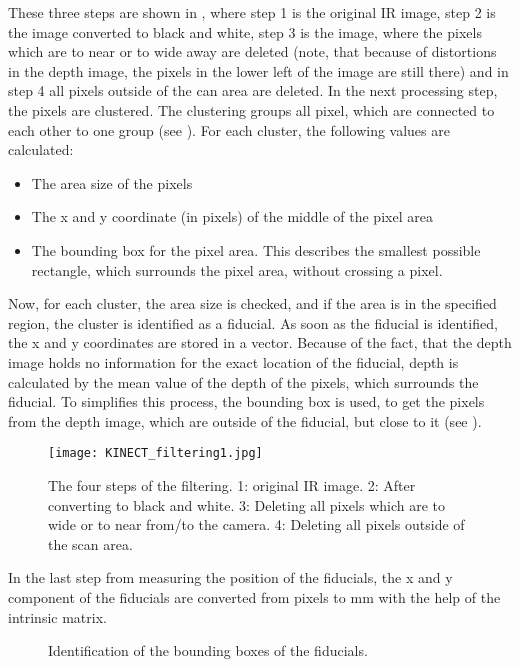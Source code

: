 These three steps are shown in , where step 1 is the original IR image, step 2 is the image converted to black and white, step 3 is the image, where the pixels which are to near or to wide away are deleted (note, that because of distortions in the depth image, the pixels in the lower left of the image are still there) and in step 4 all pixels outside of the can area are deleted.
In the next processing step, the pixels are clustered. The clustering groups all pixel, which are connected to each other to one group (see ). For each cluster, the following values are calculated:
\begin{itemize}
\item The area size of the pixels
\item The x and y coordinate (in pixels) of the middle of the pixel area
\item The bounding box for the pixel area. This describes the smallest possible rectangle,   
 which surrounds the pixel area, without crossing a pixel.
\end{itemize}
Now, for each cluster, the area size is checked, and if the area is in the specified region, the cluster is identified as a fiducial. As soon as the fiducial is identified, the x and y coordinates are stored in a vector. Because of the fact, that the depth image holds no information for the exact location of the fiducial, depth is calculated by the mean value of the depth of the pixels, which surrounds the fiducial. To simplifies this process, the bounding box is used, to get the pixels from the depth image, which are outside of the fiducial, but close to it (see ).
\begin{figure}[!t]
\centering
\texttt{[image: KINECT\_filtering1.jpg]}
\caption{The four steps of the filtering. 1: original IR image. 2: After converting to black and white. 3: Deleting all pixels which are to wide or to near from/to the camera. 4: Deleting all pixels outside of the scan area.}
\label{fig:KINECT_filtering1}
\end{figure}
In the last step from measuring the position of the fiducials, the x and y component of the fiducials are converted from pixels to mm with the help of the intrinsic matrix. 
\begin{figure}[!t]
\centering
{}
\hfil
{}
\caption{Identification of the bounding boxes of the fiducials.}
\label{fig:merged}
\end{figure}
